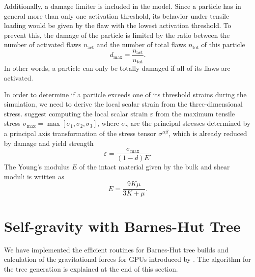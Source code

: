 \documentclass[10pt,fleqn,twoside]{article}
\begin{document}
Additionally, a damage limiter is included in the model. Since a particle has in general more than only one activation
threshold, its behavior under tensile loading would be given by the flaw with the lowest activation threshold.  To
prevent this, the damage of the particle is limited by the ratio between the number of activated flaws $n_\mathrm{act}$
and the number of total flaws $n_\mathrm{tot}$ of this particle
%
\begin{equation}
d_\mathrm{max} = \frac{n_\mathrm{act}}{n_\mathrm{tot}}.
\end{equation}
%
In other words, a particle can only be totally damaged if all of its flaws are activated.

In order to determine if a particle exceeds one of its threshold strains during the simulation, we need to derive the
local scalar strain from the three-dimensional stress. \cite{benz:1995} suggest computing the local scalar strain
$\varepsilon$ from the maximum tensile stress $\sigma_\mathrm{max} = \max [\sigma_1, \sigma_2, \sigma_3 ]$, where
$\sigma_\gamma$ are the principal stresses determined by a principal axis transformation of the stress tensor
$\sigma^{\alpha \beta}$, which is already reduced by damage and yield strength
%
\begin{equation}
\varepsilon = \frac{\sigma_\mathrm{max}}{(1-d) E}.
\end{equation}
The Young's modulus $E$ of the intact material given by the bulk and shear moduli is written as
\begin{equation}
E = \frac{9 K \mu}{3K+\mu}.
\end{equation}
%
%
\section{Self-gravity with Barnes-Hut Tree}
\label{section:self-gravity}
%
We have implemented the efficient routines for Barnes-Hut tree builds and calculation of the gravitational forces for GPUs introduced by \cite{burtscher:2011}. The algorithm
for the tree generation is explained at the end of this section.
\end{document}
